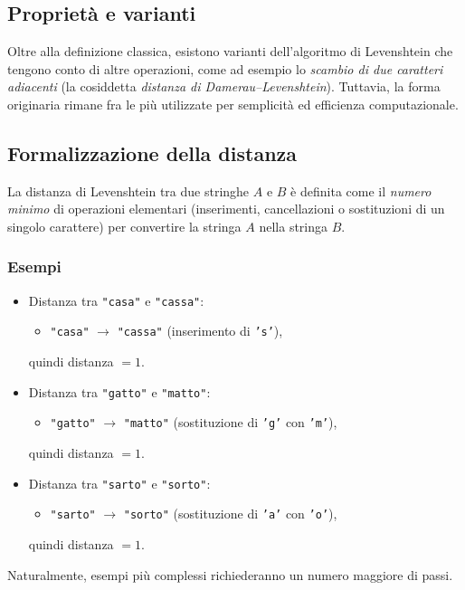 \documentclass[14pt]{extbook}
\begin{document}
\subsection{Proprietà e varianti}
Oltre alla definizione classica, esistono varianti dell'algoritmo di Levenshtein 
che tengono conto di altre operazioni, come ad esempio lo \emph{scambio di due 
caratteri adiacenti} (la cosiddetta \emph{distanza di Damerau–Levenshtein}). 
Tuttavia, la forma originaria rimane fra le più utilizzate per semplicità ed 
efficienza computazionale.

\subsection{Formalizzazione della distanza}
La distanza di Levenshtein tra due stringhe $A$ e $B$ è definita come il 
\emph{numero minimo} di operazioni elementari (inserimenti, cancellazioni 
o sostituzioni di un singolo carattere) per convertire la stringa $A$ 
nella stringa $B$. 

\subsubsection{Esempi}
\begin{itemize}
  \item Distanza tra \texttt{"casa"} e \texttt{"cassa"}: 
    \begin{itemize}
      \item \texttt{"casa"} $\rightarrow$ \texttt{"cassa"} (inserimento di \texttt{'s'}),
    \end{itemize}
    quindi distanza $=1$.
  \item Distanza tra \texttt{"gatto"} e \texttt{"matto"}:
    \begin{itemize}
      \item \texttt{"gatto"} $\rightarrow$ \texttt{"matto"} 
            (sostituzione di \texttt{'g'} con \texttt{'m'}),
    \end{itemize}
    quindi distanza $=1$.
  \item Distanza tra \texttt{"sarto"} e \texttt{"sorto"}:
    \begin{itemize}
      \item \texttt{"sarto"} $\rightarrow$ \texttt{"sorto"} 
            (sostituzione di \texttt{'a'} con \texttt{'o'}),
    \end{itemize}
    quindi distanza $=1$.
\end{itemize}
Naturalmente, esempi più complessi richiederanno un numero maggiore di passi.
\end{document}
